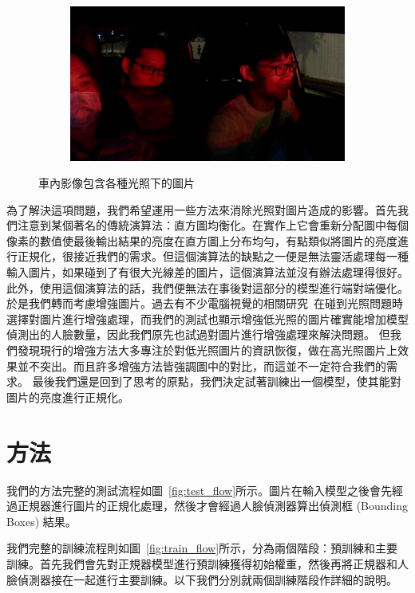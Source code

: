 \begin{figure}[t]
\begin{subfigure}[b]{0.22\textwidth}
\end{subfigure}
\begin{subfigure}[b]{0.22\textwidth}
    \includegraphics[width=\textwidth]{figures/car_7}
\end{subfigure}
\caption[車內影像範例]{車內影像包含各種光照下的圖片}
\label{fig:incar_face}
\end{figure}

為了解決這項問題，我們希望運用一些方法來消除光照對圖片造成的影響。首先我們注意到某個著名的傳統演算法：直方圖均衡化。在實作上它會重新分配圖中每個像素的數值使最後輸出結果的亮度在直方圖上分布均勻，有點類似將圖片的亮度進行正規化，很接近我們的需求。但這個演算法的缺點之一便是無法靈活處理每一種輸入圖片，如果碰到了有很大光線差的圖片，這個演算法並沒有辦法處理得很好。此外，使用這個演算法的話，我們便無法在事後對這部分的模型進行端對端優化。
於是我們轉而考慮增強圖片。過去有不少電腦視覺的相關研究~\cite{cho2018face, kalaiselvi2013face, chen2018learning}在碰到光照問題時選擇對圖片進行增強處理，而我們的測試也顯示增強低光照的圖片確實能增加模型偵測出的人臉數量，因此我們原先也試過對圖片進行增強處理來解決問題。
但我們發現現行的增強方法大多專注於對低光照圖片的資訊恢復，做在高光照圖片上效果並不突出。而且許多增強方法皆強調圖中的對比，而這並不一定符合我們的需求。
最後我們還是回到了思考的原點，我們決定試著訓練出一個模型，使其能對圖片的亮度進行正規化。

\section{方法}

我們的方法完整的測試流程如圖~\ref{fig:test_flow}所示。圖片在輸入模型之後會先經過正規器進行圖片的正規化處理，然後才會經過人臉偵測器算出偵測框 (Bounding Boxes) 結果。

我們完整的訓練流程則如圖~\ref{fig:train_flow}所示，分為兩個階段：預訓練和主要訓練。首先我們會先對正規器模型進行預訓練獲得初始權重，然後再將正規器和人臉偵測器接在一起進行主要訓練。以下我們分別就兩個訓練階段作詳細的說明。

